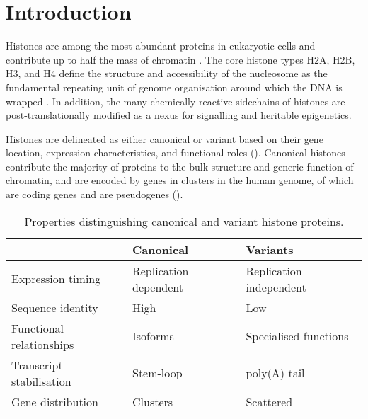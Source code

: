 \section{Introduction}

  Histones are among the most abundant proteins in eukaryotic cells
  and contribute up to half the mass of chromatin \citep{AlbertsMBoC}.
  The core histone types H2A, H2B, H3, and H4
  define the structure and accessibility of the nucleosome
  as the fundamental repeating unit of genome organisation
  around which the DNA is wrapped \citep{Luger1997structure}.
  In addition, the many chemically reactive sidechains of histones
  are post-translationally modified
  as a nexus for signalling and heritable epigenetics.

  Histones are delineated as either canonical or variant based on
  their gene location, expression characteristics,
  and functional roles ().
  Canonical histones contribute the majority of proteins to
  the bulk structure and generic function of chromatin,
  and are encoded by \TotalCoreGenes{} genes in \NumberOfClusters{}
  clusters in the human genome,
  of which \TotalCoreCodingGenes{} are coding genes and \TotalCorePseudoGenes{}
  are pseudogenes ().

  \begin{table}
    \caption{Properties distinguishing canonical and variant histone proteins.}
    \label{tab:typical-histone-differences}
    \centering
    \begin{tabular}{l l l}
      \toprule
      \null                     & Canonical             & Variants \\
      \midrule
      Expression timing         & Replication dependent & Replication independent \\
      Sequence identity         & High                  & Low \\
      Functional relationships  & Isoforms              & Specialised functions \\
      Transcript stabilisation  & Stem-loop             & poly(A) tail \\
      Gene distribution         & Clusters              & Scattered \\
      \bottomrule
    \end{tabular}
  \end{table}

